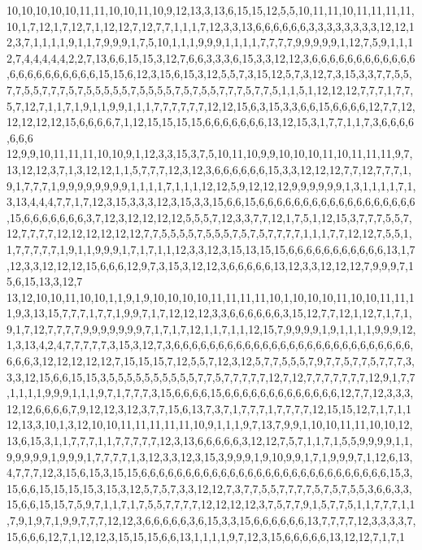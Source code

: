 10,10,10,10,10,11,11,10,10,11,10,9,12,13,3,13,6,15,15,12,5,5,10,11,11,10,11,11,11,11,10,1,7,12,1,7,12,7,1,12,12,7,12,7,7,1,1,1,7,12,3,3,13,6,6,6,6,6,6,3,3,3,3,3,3,3,3,12,12,12,3,7,1,1,1,1,9,1,1,7,9,9,9,1,7,5,10,1,1,1,9,9,9,1,1,1,1,7,7,7,7,9,9,9,9,9,1,12,7,5,9,1,1,12,7,4,4,4,4,4,2,2,7,13,6,6,15,15,3,12,7,6,6,3,3,3,6,15,3,3,12,12,3,6,6,6,6,6,6,6,6,6,6,6,6,6,6,6,6,6,6,6,6,6,6,15,15,6,12,3,15,6,15,3,12,5,5,7,3,15,12,5,7,3,12,7,3,15,3,3,7,7,5,5,7,7,5,5,7,7,7,5,7,5,5,5,5,5,7,5,5,5,5,7,5,7,5,5,7,7,7,5,7,7,5,1,1,5,1,12,12,12,7,7,7,1,7,7,5,7,12,7,1,1,7,1,9,1,1,9,9,1,1,1,7,7,7,7,7,7,12,12,15,6,3,15,3,3,6,6,15,6,6,6,6,12,7,7,12,12,12,12,12,15,6,6,6,6,7,1,12,15,15,15,15,6,6,6,6,6,6,6,13,12,15,3,1,7,7,1,1,7,3,6,6,6,6,6,6,6
12,9,9,10,11,11,11,10,10,9,1,12,3,3,15,3,7,5,10,11,10,9,9,10,10,10,11,10,11,11,11,9,7,13,12,12,3,7,1,3,12,12,1,1,5,7,7,7,12,3,12,3,6,6,6,6,6,6,15,3,3,12,12,12,7,7,12,7,7,7,1,9,1,7,7,7,1,9,9,9,9,9,9,9,9,1,1,1,1,7,1,1,1,12,12,5,9,12,12,12,9,9,9,9,9,9,1,3,1,1,1,1,7,1,3,13,4,4,4,7,7,1,7,12,3,15,3,3,3,12,3,15,3,3,15,6,6,15,6,6,6,6,6,6,6,6,6,6,6,6,6,6,6,6,6,6,15,6,6,6,6,6,6,6,3,7,12,3,12,12,12,12,5,5,5,7,12,3,3,7,7,12,1,7,5,1,12,15,3,7,7,7,5,5,7,12,7,7,7,7,12,12,12,12,12,12,7,7,5,5,5,5,7,5,5,5,7,5,7,5,7,7,7,7,1,1,1,7,7,12,12,7,5,5,1,1,7,7,7,7,7,1,9,1,1,9,9,9,1,7,1,7,1,1,12,3,3,12,3,15,13,15,15,6,6,6,6,6,6,6,6,6,6,6,13,1,7,12,3,3,12,12,12,15,6,6,6,12,9,7,3,15,3,12,12,3,6,6,6,6,6,13,12,3,3,12,12,12,7,9,9,9,7,15,6,15,13,3,12,7
13,12,10,10,11,10,10,1,1,9,1,9,10,10,10,10,11,11,11,11,10,1,10,10,10,11,10,10,11,11,11,9,3,13,15,7,7,7,1,7,7,1,9,9,7,1,7,12,12,12,3,3,6,6,6,6,6,6,3,15,12,7,7,12,1,12,7,1,7,1,9,1,7,12,7,7,7,7,9,9,9,9,9,9,9,7,1,7,1,7,12,1,1,7,1,1,12,15,7,9,9,9,9,1,9,1,1,1,1,9,9,9,12,1,3,13,4,2,4,7,7,7,7,7,3,15,3,12,7,3,6,6,6,6,6,6,6,6,6,6,6,6,6,6,6,6,6,6,6,6,6,6,6,6,6,6,6,6,6,6,3,12,12,12,12,12,7,15,15,15,7,12,5,5,7,12,3,12,5,7,7,5,5,5,7,9,7,7,5,7,7,5,7,7,7,3,3,3,12,15,6,6,15,15,3,5,5,5,5,5,5,5,5,5,5,7,7,5,7,7,7,7,7,12,7,12,7,7,7,7,7,7,7,12,9,1,7,7,1,1,1,1,9,9,9,1,1,1,9,7,1,7,7,7,3,15,6,6,6,6,15,6,6,6,6,6,6,6,6,6,6,6,6,6,12,7,7,12,3,3,3,12,12,6,6,6,6,7,9,12,12,3,12,3,7,7,15,6,13,7,3,7,1,7,7,7,1,7,7,7,7,12,15,15,12,7,1,7,1,1
12,13,3,10,1,3,12,10,10,11,11,11,11,11,10,9,1,1,1,9,7,13,7,9,9,1,10,10,11,11,10,10,12,13,6,15,3,1,1,7,7,7,1,1,7,7,7,7,7,12,3,13,6,6,6,6,6,3,12,12,7,5,7,1,1,7,1,5,5,9,9,9,9,1,1,9,9,9,9,9,1,9,9,9,1,7,7,7,7,1,3,12,3,3,12,3,15,3,9,9,9,1,9,10,9,9,1,7,1,9,9,9,7,1,12,6,13,4,7,7,7,12,3,15,6,15,3,15,15,6,6,6,6,6,6,6,6,6,6,6,6,6,6,6,6,6,6,6,6,6,6,6,6,6,6,6,6,15,3,15,6,6,15,15,15,15,3,15,3,12,5,7,5,7,3,3,12,12,7,3,7,7,5,5,7,7,7,7,5,7,5,7,5,5,3,6,6,3,3,15,6,6,15,15,7,5,9,7,1,1,7,1,7,5,5,7,7,7,7,12,12,12,12,3,7,5,7,7,9,1,5,7,7,5,1,1,7,7,7,1,1,7,9,1,9,7,1,9,9,7,7,7,12,12,3,6,6,6,6,6,3,6,15,3,3,15,6,6,6,6,6,6,13,7,7,7,7,12,3,3,3,3,7,15,6,6,6,12,7,1,12,12,3,15,15,15,6,6,13,1,1,1,1,9,7,12,3,15,6,6,6,6,6,13,12,12,7,1,7,1
